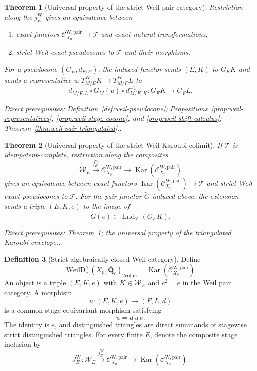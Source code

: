\documentclass[10pt]{article}
\newtheorem{theorem}{Theorem}[section]
\theoremstyle{definition}
\newtheorem{definition}[theorem]{Definition}
\newcommand{\Qlb}{\overline{\mathbf Q}_\ell}
\newcommand{\End}{\operatorname{End}}
\newcommand{\Kar}{\operatorname{Kar}}
\newcommand{\PairW}{\mathcal C_{X_0}^{\mathrm{W,pair}}}
\newcommand{\depends}[1]{\par\smallskip\noindent\textit{Direct prerequisites:} #1.}
\begin{document}
\begin{theorem}[Universal property of the strict Weil pair category]
\label{thm:weil-pair-universal}
Restriction along the $j_E^{\mathrm W}$ gives an equivalence between
\begin{enumerate}
\item exact functors $\PairW\to\mathcal T$ and exact natural
transformations;
\item strict Weil exact pseudocones to $\mathcal T$ and their morphisms.
\end{enumerate}
For a pseudocone $(G_E,d_{F/E})$, the induced functor sends $(E,K)$ to
$G_EK$ and sends a representative
$u:T^{\mathrm W}_{M/E}K\to T^{\mathrm W}_{M/F}L$ to
\[
 d_{M/F,L}\circ G_M(u)\circ d_{M/E,K}^{-1}:
 G_EK\longrightarrow G_FL.
\]
\depends{Definition~\ref{def:weil-pseudocone};
Propositions~\ref{prop:weil-representatives},
\ref{prop:weil-stage-cocone}, and \ref{prop:weil-shift-calculus};
Theorem~\ref{thm:weil-pair-triangulated}.}
\end{theorem}

\begin{theorem}[Universal property of the strict Weil Karoubi colimit]
\label{thm:weil-karoubi-universal}
If $\mathcal T$ is idempotent-complete, restriction along the composites
\[
 \mathcal W_E\xrightarrow{j_E^{\mathrm W}}\PairW
 \longrightarrow\Kar(\PairW)
\]
gives an equivalence between exact functors
$\Kar(\PairW)\to\mathcal T$ and strict Weil exact pseudocones to
$\mathcal T$.  For the pair functor $\widetilde G$ induced above, the
extension sends a triple $(E,K,e)$ to the image of
\[
 \widetilde G(e)\in\End_{\mathcal T}(G_EK).
\]
\depends{Theorem~\ref{thm:weil-pair-universal}; the universal property of
the triangulated Karoubi envelope.}
\end{theorem}

\begin{definition}[Strict algebraically closed Weil category]
\label{def:qbar-weil}
Define
\[
 \operatorname{WeilD}^b_c(X_0,\Qlb)_{\mathrm{2colim}}
 =\Kar(\PairW).
\]
An object is a triple $(E,K,e)$ with $K\in\mathcal W_E$
and $e^2=e$ in the Weil pair category.  A morphism
\[
 u:(E,K,e)\longrightarrow(F,L,d)
\]
is a common-stage equivariant morphism satisfying
\[
 u=d\,u\,e.
\]
The identity is $e$, and distinguished triangles are direct summands of
stagewise strict distinguished triangles.
For every finite $E$, denote the composite stage inclusion by
\[
 J_E^{\mathrm W}:\mathcal W_E\xrightarrow{j_E^{\mathrm W}}\PairW
 \longrightarrow\Kar(\PairW).
\]
\end{definition}
\end{document}
